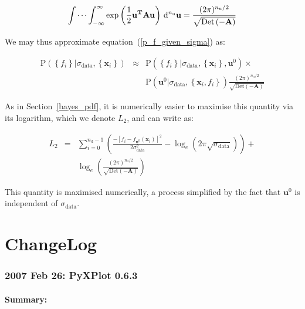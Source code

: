 \documentclass[a4paper,onecolumn,11pt]{book}
\begin{document}
\begin{equation}
\idotsint_{-\infty}^{\infty}
\exp \left(
\frac{1}{2}\mathbf{u}^\mathbf{T} \mathbf{A} \mathbf{u}
\right) \,\mathrm{d}^{n_\mathrm{u}}\mathbf{u}
=
\frac{
(2\pi)^{n_\mathrm{u}/2}
}{
\sqrt{\mathrm{Det}\left(-\mathbf{A}\right)}
}
\end{equation}

\noindent We may thus approximate equation~(\ref{p_f_given_sigma}) as:

\begin{eqnarray}
\mathrm{P}\left( \left\{ f_i \right\} | \sigma_\mathrm{data}, \left\{ \mathbf{x}_i \right\} \right)
& \approx &
\mathrm{P}\left( \left\{ f_i \right\} | \sigma_\mathrm{data}, \left\{ \mathbf{x}_i \right\}, \mathbf{u}^0 \right)
\times \\
& &
\mathrm{P}\left( \mathbf{u}^0 | \sigma_\mathrm{data}, \left\{ \mathbf{x}_i, f_i \right\} \right)
\frac{
(2\pi)^{n_\mathrm{u}/2}
}{
\sqrt{\mathrm{Det}\left(-\mathbf{A}\right)}
}
\nonumber
\end{eqnarray}

As in Section~\ref{bayes_pdf}, it is numerically easier to maximise this
quantity via its logarithm, which we denote $L_2$, and can write as:

\begin{eqnarray}
L_2 & = &
\sum_{i=0}^{n_\mathrm{d}-1}
\left(
\frac{
-\left[f_i - f_{\mathbf{u}^0}(\mathbf{x}_i)\right]^2
}{
2\sigma_\mathrm{data}^2
}
- \log_e \left(2\pi\sqrt{\sigma_\mathrm{data}} \right)
\right) +
\\ & & \nonumber
\log_e \left(
\frac{
(2\pi)^{n_\mathrm{u}/2}
}{
\sqrt{\mathrm{Det}\left(-\mathbf{A}\right)}
}
\right)
\end{eqnarray}

This quantity is maximised numerically, a process simplified by the fact that
$\mathbf{u}^0$ is independent of $\sigma_\mathrm{data}$.

\chapter{ChangeLog}

\subsection*{2007 Feb 26: PyXPlot 0.6.3}

\subsubsection*{Summary:}
\end{document}
